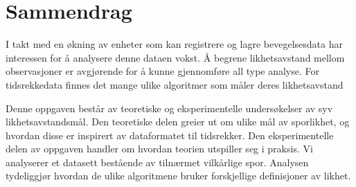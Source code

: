 \chapter*{Sammendrag}

I takt med en økning av enheter som kan registrere og lagre bevegelsesdata har interessen for å analysere denne dataen vokst. 
Å begrene likhetsavstand mellom observasjoner er avgjørende for å kunne gjennomføre all type analyse. 
For tidsrekkedata finnes det mange ulike algoritmer som måler deres likhetsavstand 

Denne oppgaven består av teoretiske og eksperimentelle undersøkelser av syv likhetsavstandsmål.
Den teoretiske delen greier ut om ulike mål av sporlikhet, og hvordan disse er inspirert av dataformatet til tidsrekker.
Den eksperimentelle delen av oppgaven handler om  hvordan teorien utspiller seg i praksis.
Vi analyserer et datasett bestående  av tilnærmet vilkårlige spor. Analysen tydeliggjør hvordan de ulike algoritmene bruker forskjellige definisjoner av likhet.
